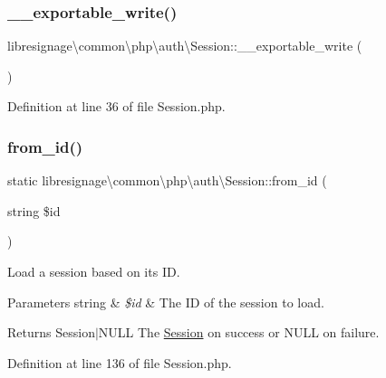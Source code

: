 \subsubsection{\texorpdfstring{\+\_\+\+\_\+exportable\+\_\+write()}{\_\_exportable\_write()}}
{\footnotesize\ttfamily libresignage\textbackslash{}common\textbackslash{}php\textbackslash{}auth\textbackslash{}\+Session\+::\+\_\+\+\_\+exportable\+\_\+write (\begin{DoxyParamCaption}{ }\end{DoxyParamCaption})}



Definition at line 36 of file Session.\+php.

\mbox{\label{classlibresignage_1_1common_1_1php_1_1auth_1_1Session_ac3fee191faeb6d10ffea413ada7a67aa}} 
\subsubsection{\texorpdfstring{from\+\_\+id()}{from\_id()}}
{\footnotesize\ttfamily static libresignage\textbackslash{}common\textbackslash{}php\textbackslash{}auth\textbackslash{}\+Session\+::from\+\_\+id (\begin{DoxyParamCaption}\item[{string}]{\$id }\end{DoxyParamCaption})\hspace{0.3cm}{\ttfamily [static]}}

Load a session based on its ID.


\begin{DoxyParams}[1]{Parameters}
string & {\em \$id} & The ID of the session to load.\\
\hline
\end{DoxyParams}
\begin{DoxyReturn}{Returns}
Session$\vert$\+N\+U\+LL The \hyperlink{classlibresignage_1_1common_1_1php_1_1auth_1_1Session}{Session} on success or N\+U\+LL on failure. 
\end{DoxyReturn}


Definition at line 136 of file Session.\+php.

\mbox{\label{classlibresignage_1_1common_1_1php_1_1auth_1_1Session_ab473ae12cd0ca15342cbc65c00e451b3}} 
